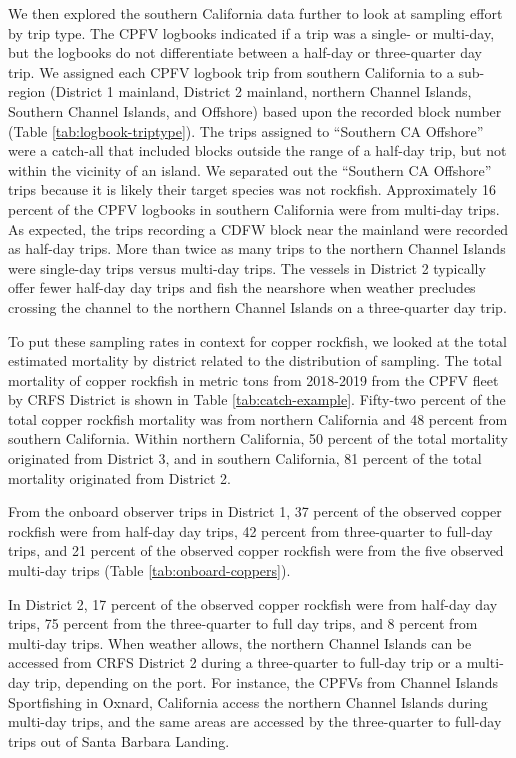 \documentclass[11pt,
  letterpaper,
]{article}
\begin{document}
We then explored the southern California data further to look at sampling effort by trip type. The CPFV logbooks indicated if a trip was a single- or multi-day, but the logbooks do not differentiate between a half-day or three-quarter day trip. We assigned each CPFV logbook trip from southern California to a sub-region (District 1 mainland, District 2 mainland, northern Channel Islands, Southern Channel Islands, and Offshore) based upon the recorded block number (Table \ref{tab:logbook-triptype}). The trips assigned to ``Southern CA Offshore'' were a catch-all that included blocks outside the range of a half-day trip, but not within the vicinity of an island. We separated out the ``Southern CA Offshore'' trips because it is likely their target species was not rockfish. Approximately 16 percent of the CPFV logbooks in southern California were from multi-day trips. As expected, the trips recording a CDFW block near the mainland were recorded as half-day trips. More than twice as many trips to the northern Channel Islands were single-day trips versus multi-day trips. The vessels in District 2 typically offer fewer half-day day trips and fish the nearshore when weather precludes crossing the channel to the northern Channel Islands on a three-quarter day trip.

To put these sampling rates in context for copper rockfish, we looked at the total estimated mortality by district related to the distribution of sampling. The total mortality of copper rockfish in metric tons from 2018-2019 from the CPFV fleet by CRFS District is shown in Table \ref{tab:catch-example}. Fifty-two percent of the total copper rockfish mortality was from northern California and 48 percent from southern California. Within northern California, 50 percent of the total mortality originated from District 3, and in southern California, 81 percent of the total mortality originated from District 2.

From the onboard observer trips in District 1, 37 percent of the observed copper rockfish were from half-day day trips, 42 percent from three-quarter to full-day trips, and 21 percent of the observed copper rockfish were from the five observed multi-day trips (Table \ref{tab:onboard-coppers}).

In District 2, 17 percent of the observed copper rockfish were from half-day day trips, 75 percent from the three-quarter to full day trips, and 8 percent from multi-day trips. When weather allows, the northern Channel Islands can be accessed from CRFS District 2 during a three-quarter to full-day trip or a multi-day trip, depending on the port. For instance, the CPFVs from Channel Islands Sportfishing in Oxnard, California access the northern Channel Islands during multi-day trips, and the same areas are accessed by the three-quarter to full-day trips out of Santa Barbara Landing.
\end{document}
